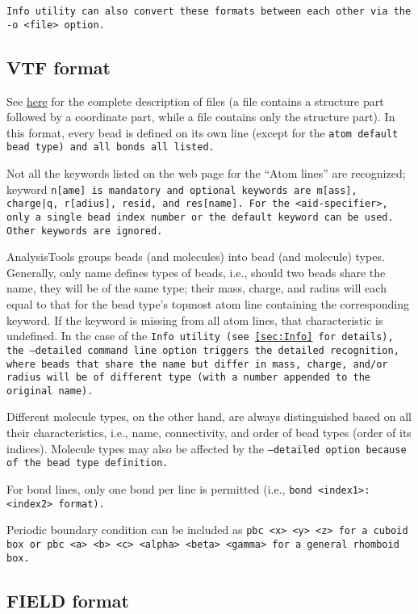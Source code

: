 \tt{Info} utility can also convert these formats between each other via the
\tt{-o <file>} option.

\subsection{VTF format}\label{ssec:StructVtf} %

See \href{https://github.com/olenz/vtfplugin/wiki/VTF-format}{here} for the
complete description of \vtsf files (a \vtf file contains a structure part
followed by a coordinate part, while a \vsf file contains only the structure
part). In this format, every bead is defined on its own line (except for the
\tt{atom default} bead type) and all bonds all listed.

Not all the keywords listed on the web page for the \enquote{Atom lines} are
recognized; keyword \tt{n[ame]} is mandatory and optional keywords are
\tt{m[ass]}, \tt{charge|q}, \tt{r[adius]}, \tt{resid}, and \tt{res[name]}. For
the \tt{<aid-specifier>}, only a single bead index number or the \tt{default}
keyword can be used. Other keywords are ignored.

AnalysisTools groups beads (and molecules) into bead (and molecule) types.
Generally, only name defines types of beads, i.e., should two beads share the
name, they will be of the same type; their mass, charge, and radius will each
equal to that for the bead type’s topmost atom line containing the corresponding
keyword. If the keyword is missing from all atom lines, that characteristic is
undefined. In the case of the \tt{Info} utility (see \cref{sec:Info} for
details), the \tt{--detailed} command line option triggers the detailed
recognition, where beads that share the name but differ in mass, charge, and/or
radius will be of different type (with a number appended to the original name).

Different molecule types, on the other hand, are always distinguished based on
all their characteristics, i.e., name, connectivity, and order of bead types
(order of its \vsf indices). Molecule types may also be affected by the
\tt{--detailed} option because of the bead type definition.

For bond lines, only one bond per line is permitted (i.e., \tt{bond
<index1>:<index2>} format).

Periodic boundary condition can be included as \tt{pbc <x> <y> <z>} for a cuboid
box or \tt{pbc <a> <b> <c> <alpha> <beta> <gamma>} for a general rhomboid
box. %

\subsection{FIELD format}\label{ssec:StructField} %

